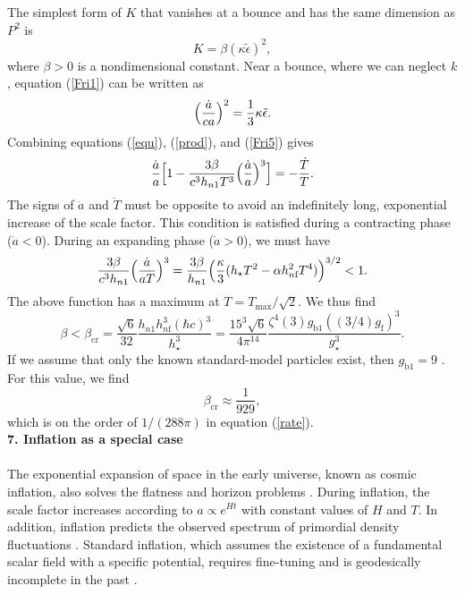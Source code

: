 \documentclass[prd,onecolumn,nofootinbib]{revtex4}
\begin{document}
The simplest form of $K$ that vanishes at a bounce and has the same dimension as $P^2$ is
\begin{equation}
K=\beta(\kappa\tilde{\epsilon})^2,
\label{prod}
\end{equation}
where $\beta>0$ is a nondimensional constant.
Near a bounce, where we can neglect $k$, equation (\ref{Fri1}) can be written as
\begin{equation}
\Bigl(\frac{\dot{a}}{ca}\Bigr)^2=\frac{1}{3}\kappa\tilde{\epsilon}.
\label{Fri5}
\end{equation}
Combining equations (\ref{equ}), (\ref{prod}), and (\ref{Fri5}) gives
\begin{equation}
\frac{\dot{a}}{a}\Bigl[1-\frac{3\beta}{c^3 h_{n1}T^3}\Bigl(\frac{\dot{a}}{a}\Bigr)^3\Bigr]=-\frac{\dot{T}}{T}.
\label{ineq}
\end{equation}
The signs of $\dot{a}$ and $\dot{T}$ must be opposite to avoid an indefinitely long, exponential increase of the scale factor.
This condition is satisfied during a contracting phase ($\dot{a}<0$).
During an expanding phase ($\dot{a}>0$), we must have
\begin{equation}
\frac{3\beta}{c^3 h_{n1}}\Bigl(\frac{\dot{a}}{aT}\Bigr)^3=\frac{3\beta}{h_{n1}}\Bigl(\frac{\kappa}{3}(h_\star T^2-\alpha h_{n\textrm{f}}^2 T^4)\Bigr)^{3/2}<1.
\end{equation}
The above function has a maximum at $T=T_\textrm{max}/\sqrt{2}$.
We thus find
\begin{equation}
\beta<\beta_\textrm{cr}=\frac{\sqrt{6}}{32}\frac{h_{n1}h_{n\textrm{f}}^3(\hbar c)^3}{h_\star^3}=\frac{15^3\sqrt{6}}{4\pi^{14}}\frac{\zeta^4(3)g_{\textrm{b}1}((3/4)g_\textrm{f})^3}{g_\star^3}.
\end{equation}
If we assume that only the known standard-model particles exist, then $g_{\textrm{b}1}=9$ \cite{Ric}.
For this value, we find
\begin{equation}
\beta_\textrm{cr}\approx\frac{1}{929},
\end{equation}
which is on the order of $1/(288\pi)$ in equation (\ref{rate}).\\


{\bf 7. Inflation as a special case}\\ \\
The exponential expansion of space in the early universe, known as cosmic inflation, also solves the flatness and horizon problems \cite{infl}.
During inflation, the scale factor increases according to $a\propto e^{Ht}$ with constant values of $H$ and $T$.
In addition, inflation predicts the observed spectrum of primordial density fluctuations \cite{pert}.
Standard inflation, which assumes the existence of a fundamental scalar field with a specific potential, requires fine-tuning and is geodesically incomplete in the past \cite{inc}.
\end{document}
